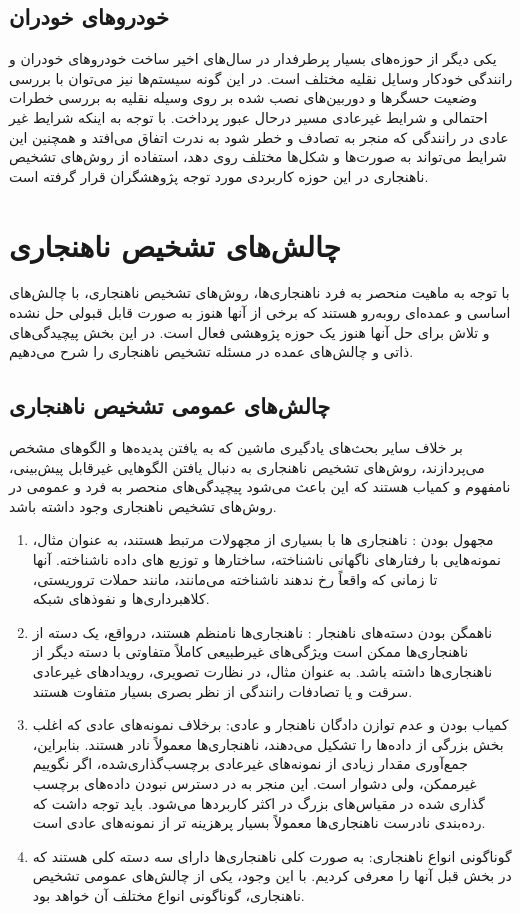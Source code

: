 \documentclass[12pt,a4paper]{report}
\begin{document}
\subsection{خودرو‌های خودران}
یکی دیگر از حوزه‌های بسیار پرطرفدار در سال‌های اخیر ساخت خودرو‌های خودران و رانندگی خودکار وسایل نقلیه مختلف است. در این گونه سیستم‌ها نیز می‌توان با بررسی وضعیت حسگر‌ها و دوربین‌های نصب شده بر روی وسیله نقلیه به بررسی خطرات احتمالی و شرایط غیرعادی مسیر درحال عبور پرداخت. با توجه به اینکه شرایط غیر عادی در رانندگی که منجر به تصادف و خطر شود به ندرت اتفاق می‌افتد و همچنین این شرایط می‌تواند به صورت‌ها و شکل‌ها مختلف روی دهد، استفاده از روش‌های تشخیص ناهنجاری در این حوزه کاربردی مورد توجه پژوهشگران قرار گرفته است.

\section{چالش‌‌های تشخیص ناهنجاری}
با توجه به ماهیت منحصر به فرد ناهنجاری‌ها،‌ روش‌های تشخیص ناهنجاری، با چالش‌های اساسی و عمده‌ای روبه‌رو هستند که برخی از آنها هنوز به صورت قابل قبولی حل نشده و تلاش برای حل آنها هنوز یک حوزه پژوهشی فعال است. در این بخش پیچیدگی‌های ذاتی و چالش‌های عمده در مسئله تشخیص ناهنجاری را شرح می‌‌دهیم. 
\subsection{چالش‌های عمومی تشخیص ناهنجاری}
بر خلاف سایر بحث‌های یادگیری ماشین که به یافتن پدیده‌ها و الگوهای مشخص می‌پردازند، روش‌های تشخیص ناهنجاری به دنبال یافتن الگوهایی غیرقابل پیش‌بینی، نامفهوم و کمیاب هستند که این باعث می‌شود پیچیدگی‌های منحصر به فرد و عمومی در روش‌های تشخیص ناهنجاری وجود داشته باشد.
\begin{enumerate}
\item{مجهول بودن :‌
ناهنجاری ها با بسیاری از مجهولات مرتبط هستند، به عنوان مثال، نمونه‌هایی با رفتارهای ناگهانی ناشناخته، ساختارها و توزیع های داده ناشناخته. آنها تا زمانی که واقعاً رخ ندهند ناشناخته می‌مانند، مانند حملات تروریستی، کلاهبرداری‌ها و نفوذهای شبکه.
}
\item
{
ناهمگن بودن دسته‌های ناهنجار 
:
ناهنجاری‌ها نامنظم هستند، درواقع، یک دسته از ناهنجاری‌ها ممکن است ویژگی‌های غیرطبیعی کاملاً متفاوتی با دسته دیگر از ناهنجاری‌ها داشته باشد. به عنوان مثال، در نظارت تصویری، رویدادهای غیرعادی سرقت و یا تصادفات رانندگی از نظر بصری بسیار متفاوت هستند.
}

\item{
کمیاب بودن و عدم توازن دادگان ناهنجار و عادی:
برخلاف نمونه‌های عادی که اغلب بخش بزرگی از داده‌ها را تشکیل می‌دهند، ناهنجاری‌ها معمولاً نادر هستند. بنابراین، جمع‌آوری مقدار زیادی از نمونه‌های غیرعادی برچسب‌گذاری‌شده، اگر نگوییم غیرممکن، ولی دشوار است. این منجر به در دسترس نبودن داده‌های برچسب گذاری شده در مقیاس‌های بزرگ در اکثر کاربرد‌ها می‌شود. باید توجه داشت که  رده‌بندی نادرست ناهنجاری‌ها معمولاً بسیار پرهزینه تر از نمونه‌های عادی است.
}

\item{
گوناگونی انواع ناهنجاری:
به صورت کلی ناهنجاری‌ها دارای سه دسته کلی هستند که در بخش قبل آنها را معرفی کردیم. با این وجود، یکی از چالش‌های عمومی تشخیص ناهنجاری، گوناگونی انواع مختلف آن خواهد بود.
}
\end{enumerate}
\end{document}
